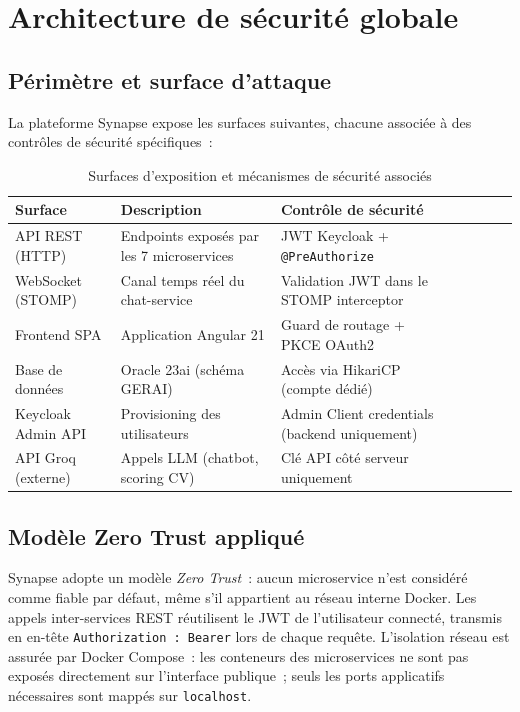 \section{Architecture de sécurité globale}

\subsection{Périmètre et surface d’attaque}

La plateforme Synapse expose les surfaces suivantes, chacune associée à des contrôles
de sécurité spécifiques~:

\begin{table}[H]
\centering
\caption{Surfaces d'exposition et mécanismes de sécurité associés}
\label{tab:surfaces_securite}
\begin{tabularx}{\textwidth}{VlVLVLV}
\hline
\textbf{Surface} & \textbf{Description} & \textbf{Contrôle de sécurité} \\
\hline
API REST (HTTP) & Endpoints exposés par les 7 microservices & JWT Keycloak + \texttt{@PreAuthorize} \\
\hline
WebSocket (STOMP) & Canal temps réel du chat-service & Validation JWT dans le STOMP interceptor \\
\hline
Frontend SPA & Application Angular 21 & Guard de routage + PKCE OAuth2 \\
\hline
Base de données & Oracle 23ai (schéma GERAI) & Accès via HikariCP (compte dédié) \\
\hline
Keycloak Admin API & Provisioning des utilisateurs & Admin Client credentials (backend uniquement) \\
\hline
API Groq (externe) & Appels LLM (chatbot, scoring CV) & Clé API côté serveur uniquement \\
\hline
\end{tabularx}
\end{table}

\subsection{Modèle Zero Trust appliqué}

Synapse adopte un modèle \textit{Zero Trust}~: aucun microservice n’est considéré
comme fiable par défaut, même s’il appartient au réseau interne Docker. Les appels
inter-services REST réutilisent le JWT de l’utilisateur connecté, transmis en
en-tête \texttt{Authorization~: Bearer} lors de chaque requête. L’isolation réseau
est assurée par Docker Compose~: les conteneurs des microservices ne sont pas
exposés directement sur l’interface publique~; seuls les ports applicatifs nécessaires
sont mappés sur \texttt{localhost}.


